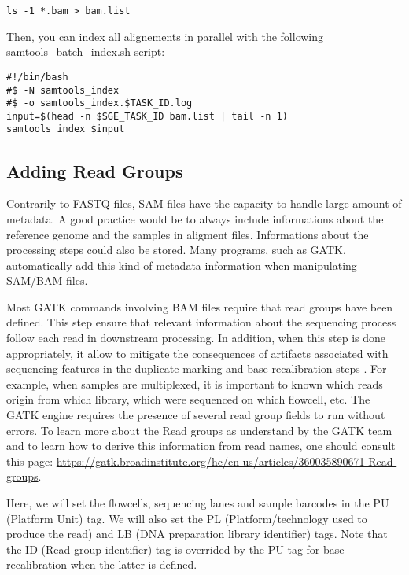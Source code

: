 \begin{verbatim}
ls -1 *.bam > bam.list
\end{verbatim}

Then, you can index all alignements in parallel with the following samtools\_batch\_index.sh script:

\begin{verbatim}
#!/bin/bash
#$ -N samtools_index
#$ -o samtools_index.$TASK_ID.log
input=$(head -n $SGE_TASK_ID bam.list | tail -n 1)
samtools index $input
\end{verbatim}





\subsection{Adding Read Groups}

Contrarily to FASTQ files, SAM files have the capacity to handle large amount of metadata. A good practice would be to always include informations about the reference genome and the samples in aligment files. Informations about the processing steps could also be stored. Many programs, such as GATK, automatically add this kind of metadata information when manipulating SAM/BAM files.


Most GATK commands involving BAM files require that read groups have been defined. This step ensure that relevant information about the sequencing process follow each read in downstream processing. In addition, when this step is done appropriately, it allow to mitigate the consequences of artifacts associated with sequencing features in the duplicate marking and base recalibration steps \cite{GATK_ReadGroups}. For example, when samples are multiplexed, it is important to known which reads origin from which library, which were sequenced on which flowcell, etc. The GATK engine requires the presence of several read group fields to run without errors. To learn more about the Read groups as understand by the GATK team and to learn how to derive this information from read names, one should consult this page: \href{https://gatk.broadinstitute.org/hc/en-us/articles/360035890671-Read-groups}{https://gatk.broadinstitute.org/hc/en-us/articles/360035890671-Read-groups}.

Here, we will set the flowcells, sequencing lanes and sample barcodes in the PU (Platform Unit) tag. We will also set the PL (Platform/technology used to produce the read) and LB (DNA preparation library identifier) tags. Note that the ID (Read group identifier) tag is overrided by the PU tag for base recalibration when the latter is defined.

